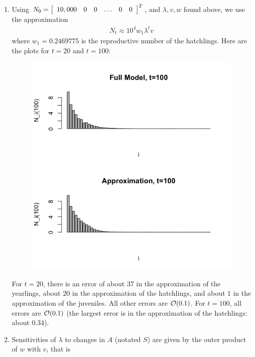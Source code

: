 \documentclass{article} %
\theoremstyle{plain}
\numberwithin{equation}{section} %
\numberwithin{figure}{section} %
\numberwithin{table}{section} %
\begin{document}
\begin{enumerate}[\ \ (a)]
    \item
        Using $N_0 = \qty[\begin{array}{ccccccc} 10,000 & 0 & 0 & \dots & 0 & 0\end{array}]^T$, and $\lambda,v,w$ found above, we use the approximation
        \begin{align*}
            N_t \approx 10^4w_1\lambda^{t}v
        \end{align*}
        where $w_1=0.2469775$ is the reproductive number of the hatchlings.  Here are the plots for $t=20$ and $t=100$:
        \begin{figure}[ht!]
            \centering
            \includegraphics[scale=0.4]{figure_1c.png}
        \end{figure}
        \FloatBarrier
        For $t = 20$, there is an error of about $37$ in the approximation of the yearlings, about $20$ in the approximation of the hatchlings, and about $1$ in the approximation of the juveniles.  All other errors are $\order{0.1}$.  For $t = 100$, all errors are $\order{0.1}$ (the largest error is in the approximation of the hatchlings: about $0.34$).
    \item
        Sensitivities of $\lambda$ to changes in $A$ (notated $S$) are given by the outer product of $w$ with $v$, that is
        \begin{align*}

\end{align*}
\end{enumerate}
\end{document}
